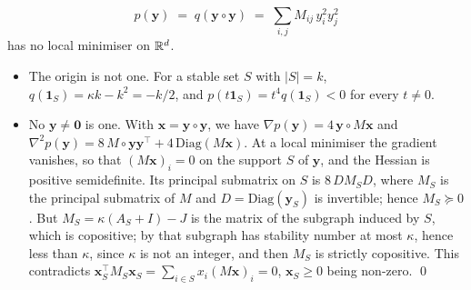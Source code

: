 \documentclass[handoutsbeamer.tex]{subfiles}
\begin{document}
\begin{frame}
\onp{\scriptsize}
\begin{equation}\label{eq:ch05:quartic}
    p(\boldsymbol y) \;=\; q(\boldsymbol y\circ\boldsymbol y) \;=\; \sum_{i,j}M_{ij}\,y_i^2y_j^2
\end{equation}
has no local minimiser on $\mathbb{R}^d$.
\begin{itemize}\setlength\itemsep{0.15em}
    \item The origin is not one. For a stable set $S$ with $|S| = k$, $q(\boldsymbol1_S) = \kappa k-k^2 = -k/2$, and $p(t\boldsymbol1_S) = t^4q(\boldsymbol1_S)<0$ for every $t\ne0$.
    \item No $\boldsymbol y\ne\boldsymbol0$ is one. With $\boldsymbol x = \boldsymbol y\circ\boldsymbol y$, we have $\nabla p(\boldsymbol y) = 4\,\boldsymbol y\circ M\boldsymbol x$ and $\nabla^2p(\boldsymbol y) = 8\,M\circ\boldsymbol y\boldsymbol y^\top+4\,\mathrm{Diag}(M\boldsymbol x)$. At a local minimiser the gradient vanishes, so that $(M\boldsymbol x)_i = 0$ on the support $S$ of $\boldsymbol y$, and the Hessian is positive semidefinite. Its principal submatrix on $S$ is $8\,DM_SD$, where $M_S$ is the principal submatrix of $M$ and $D = \mathrm{Diag}(\boldsymbol y_S)$ is invertible; hence $M_S\succeq0$. But $M_S = \kappa(A_S+I)-J$ is the matrix of the subgraph induced by $S$, which is copositive; by  that subgraph has stability number at most $\kappa$, hence less than $\kappa$, since $\kappa$ is not an integer, and then $M_S$ is strictly copositive. This contradicts $\boldsymbol x_S^\top M_S\boldsymbol x_S = \sum_{i\in S}x_i(M\boldsymbol x)_i = 0$, $\boldsymbol x_S\ge0$ being non-zero. \qed
\end{itemize}
\end{frame}
\end{document}
